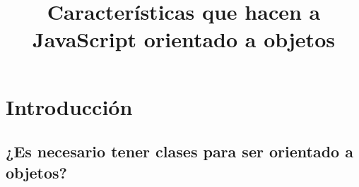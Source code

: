 \documentclass[12pt]{article}
\begin{document}
\title{Características que hacen a JavaScript orientado a objetos}
\author{}
\date{}
\maketitle










\section*{Introducción}

\subsection*{¿Es necesario tener clases para ser orientado a objetos?}
\end{document}

